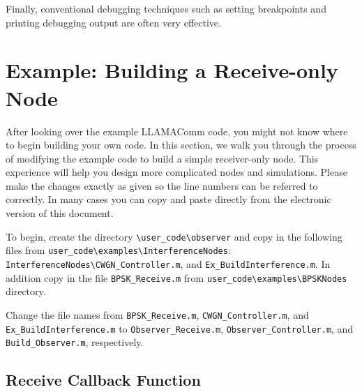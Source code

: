 Finally, conventional debugging techniques such as setting breakpoints and
printing debugging output are often very effective.

\section{Example: Building a Receive-only Node}
\label{sec:adding_observer}
After looking over the example LLAMAComm code, you might not know where to begin building your own code.  In this section, we walk you through the process of modifying the example code to build a simple receiver-only node.  This experience will help you design more complicated nodes and simulations.  Please make the changes exactly as given so the line numbers can be referred to correctly.  In many cases you can copy and paste directly from the electronic version of this document.

To begin, create the directory \verb+\user_code\observer+ and copy in the following files from 
\verb+user_code\examples\InterferenceNodes+: \verb+InterferenceNodes\CWGN_Controller.m+, and \verb+Ex_BuildInterference.m+.  
In addition copy in the file \verb+BPSK_Receive.m+ from \verb+user_code\examples\BPSKNodes+ directory.


Change the file names from \verb+BPSK_Receive.m+, \verb+CWGN_Controller.m+, and \verb+Ex_BuildInterference.m+ to \verb+Observer_Receive.m+, \verb+Observer_Controller.m+, and \verb+Build_Observer.m+, respectively.

\subsection{Receive Callback Function}
\label{sec:observer_rec}

